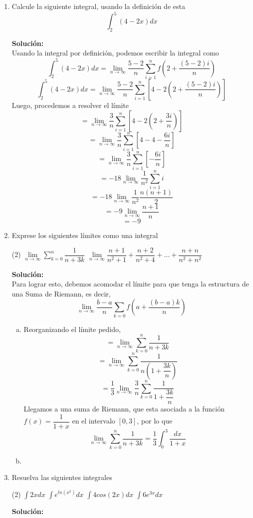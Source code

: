\documentclass[12pt]{article}
\newenvironment{solucion}
{\begin{mdframed}[backgroundcolor=black!10]
		{\bf Solución:}\\
	}
	{
	\end{mdframed}
}
\newenvironment{preguntas}
{\begin{enumerate}\itemsep12pt
	}
	{
	\end{enumerate}
}
\newcommand{\ra}{\rightarrow}
\begin{document}
\begin{preguntas}
\item Calcule la siguiente integral, usando la definición de esta
	$$\int_2^5(4-2x)dx$$
\begin{solucion}
Usando la integral por definición, podemos escribir la integral como
		$$\int_2^5(4-2x)dx = \lim\limits_{n\ra \infty} \dfrac{5-2}{n} \sum\limits_{i=1}^n f \left(2+\dfrac{(5-2)i}{n}\right) $$
		$$\int_2^5(4-2x)dx = \lim\limits_{n\ra \infty} \dfrac{5-2}{n} \sum\limits_{i=1}^n \left[4-2 \left(2+\dfrac{(5-2)i}{n}\right)\right]$$
		Luego, procedemos a resolver el límite
		$$= \lim\limits_{n\ra \infty} \dfrac{3}{n} \sum\limits_{i=1}^n \left[4-2 \left(2+\dfrac{3i}{n}\right)\right]$$
		$$= \lim\limits_{n\ra \infty} \dfrac{3}{n} \sum\limits_{i=1}^n \left[4-4-\dfrac{6i}{n}\right]$$
		$$= \lim\limits_{n\ra \infty} \dfrac{3}{n} \sum\limits_{i=1}^n \left[-\dfrac{6i}{n}\right]$$
		$$= -18\lim\limits_{n\ra \infty} \dfrac{1}{n^2} \sum\limits_{i=1}^n i$$
		$$= -18\lim\limits_{n\ra \infty} \dfrac{1}{n^2} \dfrac{n(n+1)}{2}$$
		$$= -9\lim\limits_{n\ra \infty} \dfrac{n+1}{n}$$
		$$= -9$$
\end{solucion}
\item Exprese los siguientes límites como una integral
	
\begin{tasks}(2)
\task $\lim\limits_{n\ra \infty} \sum\limits_{k=0}^n \dfrac{1}{n+3k}$
\task $\lim\limits_{n \ra \infty} \dfrac{n+1}{n^2+1} + \dfrac{n+2}{n^2+4} + \dots  + \dfrac{n+n}{n^2+n^2}$
\end{tasks}
\begin{solucion}
Para lograr esto, debemos acomodar el límite para que tenga la estructura de una Suma de Riemann, es decir,
		$$\lim\limits_{n \ra \infty} \dfrac{b-a}{n}\sum\limits_{k=0} f\left(a+\dfrac{(b-a)k}{n}\right)$$
\begin{enumerate}[a)]
\item Reorganizando el límite pedido,
		$$ = \lim\limits_{n\ra \infty} \sum\limits_{k=0}^n \dfrac{1}{n+3k}$$
		$$ = \lim\limits_{n\ra \infty} \sum\limits_{k=0}^n \dfrac{1}{n\left(1+\dfrac{3k}{n}\right)}$$
		$$ = \dfrac{1}{3} \lim\limits_{n\ra \infty} \dfrac{3}{n} \sum\limits_{k=0}^n \dfrac{1}{1+\dfrac{3k}{n}}$$
		Llegamos a una suma de Riemann, que esta asociada a la función $f(x) = \dfrac{1}{1+x}$ en el intervalo $[0, 3]$, por lo que
		$$\lim\limits_{n\ra \infty} \sum\limits_{k=0}^n \dfrac{1}{n+3k} = \dfrac{1}{3} \displaystyle\int_0^3 \dfrac{dx}{1+x}$$
\item 
\end{enumerate}
\end{solucion}
\item Resuelva las siguientes integrales
\begin{tasks}(2)
\task $\displaystyle\int 2xdx$
\task $\displaystyle\int e^{ln(x^2)}dx$
\task $\displaystyle\int 4cos(2x)dx$
\task $\displaystyle\int 6e^{3x}dx$
\end{tasks}
\begin{solucion}


\end{solucion}
\end{preguntas}
\end{document}

